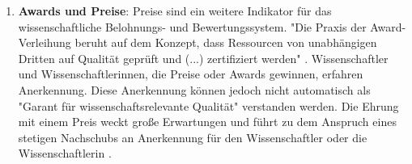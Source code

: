 \begin{enumerate}
\item \textbf{Awards und Preise}: Preise sind ein weitere Indikator für das wissenschaftliche Belohnungs- und Bewertungssystem. "Die Praxis der Award-Verleihung beruht auf dem Konzept, dass Ressourcen von unabhängigen Dritten auf Qualität geprüft und (...) zertifiziert werden" \cite{bargheer_2002_qualitatskriterien}. Wissenschaftler und Wissenschaftlerinnen, die Preise oder Awards gewinnen, erfahren Anerkennung. Diese Anerkennung können jedoch nicht automatisch als "Garant für wissenschaftsrelevante Qualität"\cite{bargheer_2002_qualitatskriterien} verstanden werden. Die Ehrung mit einem Preis weckt große Erwartungen und führt zu dem Anspruch eines stetigen Nachschubs an Anerkennung für den Wissenschaftler oder die Wissenschaftlerin \cite{suchen}.
\end{enumerate}
